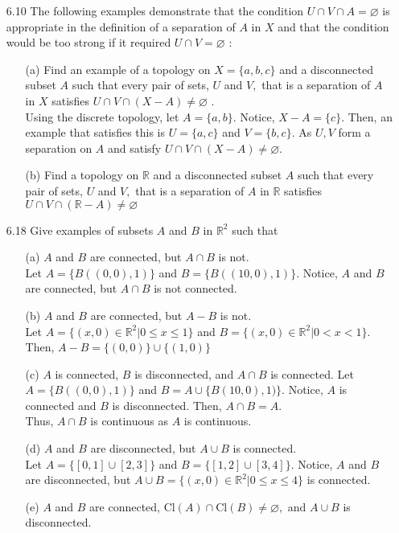 \documentclass[12pt]{article}
\newcommand{\R}{\mathbb{R}}
\begin{document}
\begin{enumerate}
		\item[6.10] The following examples demonstrate that the condition $U \cap V \cap A = \varnothing$ is appropriate in the definition of a separation of $A$ in $X$ and that the condition would be too strong if it required $U \cap V = \varnothing$ :
		\begin{enumerate}
			\item[(a)] Find an example of a topology on $X = \{ a , b , c \}$ and a disconnected subset
			$A$ such that every pair of sets, $U$ and $V ,$ that is a separation of $A$ in $X$
			satisfies $U \cap V \cap ( X - A ) \neq \varnothing$ .\\
			Using the discrete topology, let $ A = \{a,b\} $. Notice, $ X-A =\{c\} $. Then, an example that satisfies this is $ U = \{a,c\} $ and $ V = \{b,c\} $. As $ U,V $ form a separation on $ A $ and satisfy $U \cap V \cap ( X - A ) \neq \varnothing$. 
			\item[(b)] Find a topology on $\mathbb { R }$ and a disconnected subset $A$ such that every pair of
			sets, $U$ and $V ,$ that is a separation of $A$ in $\mathbb { R }$ satisfies $U \cap V \cap ( \mathbb { R } - A ) \neq \varnothing$
		\end{enumerate}
		\item[6.18] Give examples of subsets $A$ and $B$ in $\mathbb { R } ^ { 2 }$ such that
		\begin{enumerate}
			\item[(a)] $A$ and $B$ are connected, but $A \cap B$ is not.\\
			 Let $ A = \{B((0,0),1)\} $ and $ B=\{B((10,0),1)\} $. Notice, $ A $ and $ B $ are connected, but $ A\cap B $ is not connected.
			\item[(b)] $A$ and $B$ are connected, but $A - B$ is not.\\
				Let $ A = \{(x,0)\in \R^2|0\leq x\leq1\} $ and $ B=\{(x,0)\in \R^2|0<x<1\} $. Then, $ A-B= \{(0,0)\}\cup\{(1,0)\} $
			\item[(c)] $A$ is connected, $B$ is disconnected, and $A \cap B$ is connected.
				Let $A= \{B((0,0),1)\}$ and $ B=A\cup\{B(10,0),1)\} $. Notice, $ A $ is connected and $ B $ is disconnected. Then, $ A\cap B = A$.\\
				 Thus, $ A\cap B $ is continuous as $ A $ is continuous.
			\item[(d)] $A$ and $B$ are disconnected, but $A \cup B$ is connected.\\
			Let $ A=\{[0,1]\cup[2,3]\} $ and $ B=\{[1,2]\cup[3,4]\} $. Notice, $ A $ and $ B $ are disconnected, but $ A\cup B = \{(x,0)\in\R^2|0\leq x \leq 4\} $ is connected.
			\item[(e)] $A$ and $B$ are connected, $\mathrm { Cl } ( A ) \cap \mathrm { Cl } ( B ) \neq \varnothing ,$ and $A \cup B$ is disconnected.
		\end{enumerate}
		

\end{enumerate}
\end{document}
